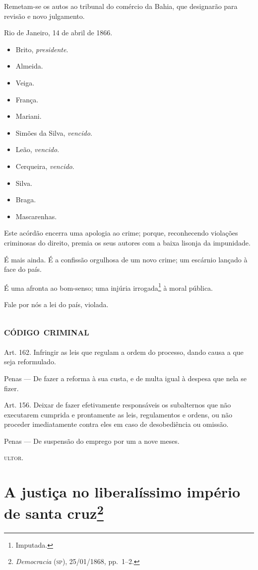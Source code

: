 Remetam-se os autos ao tribunal do comércio da Bahia, que designarão
para revisão e novo julgamento.

Rio de Janeiro, 14 de abril de 1866.

\begin{itemize}
\tightlist
\item
  Brito, \emph{presidente}.
\item
  Almeida.
\item
  Veiga.
\item
  França.
\item
  Mariani.
\item
  Simões da Silva, \emph{vencido}.
\item
  Leão, \emph{vencido}.
\item
  Cerqueira, \emph{vencido}.
\item
  Silva.
\item
  Braga.
\item
  Mascarenhas.
\end{itemize}

Este acórdão encerra uma apologia ao crime; porque, reconhecendo
violações criminosas do direito, premia os seus autores com a baixa
lisonja da impunidade.

É mais ainda. É a confissão orgulhosa de um novo crime; um escárnio
lançado à face do país.

É uma afronta ao bom-senso; uma injúria irrogada\footnote{Imputada.} à
moral pública.

Fale por nós a lei do país, violada.

\section{\textsc{código criminal}}

Art. 162. Infringir as leis que regulam a ordem do processo, dando causa
a que seja reformulado.

Penas --- De fazer a reforma à sua custa, e de multa igual à despesa que
nela se fizer.

Art. 156. Deixar de fazer efetivamente responsáveis os subalternos que
não executarem cumprida e prontamente as leis, regulamentos e ordens, ou
não proceder imediatamente contra eles em caso de desobediência ou
omissão.

Penas --- De suspensão do emprego por um a nove meses.

\textsc{ultor}.

\chapter{A justiça no liberalíssimo império de santa cruz\footnote{\emph{Democracia} (\textsc{sp}), 25/01/1868, pp.~1--2.}}

